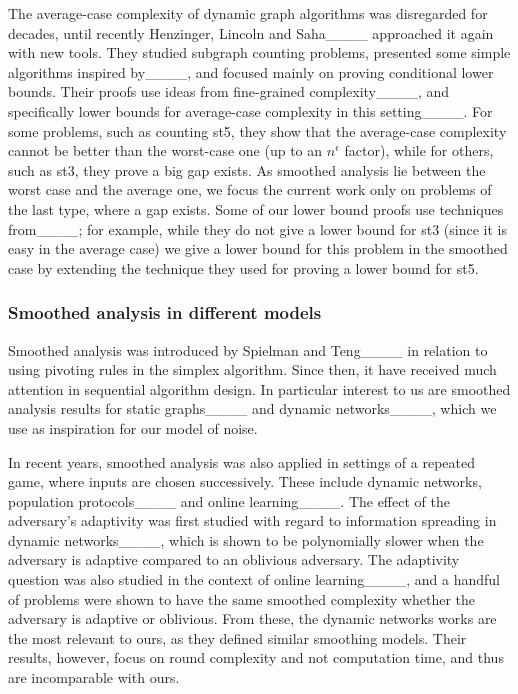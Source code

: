  
The average-case complexity of dynamic graph algorithms was disregarded for decades, until recently Henzinger, Lincoln and Saha____
approached it again with new tools.
They studied subgraph counting problems, 
presented some simple algorithms inspired by____,
and focused mainly on proving conditional lower bounds.
Their proofs use ideas from fine-grained complexity____, and specifically lower bounds for average-case complexity in this setting____.
For some problems, such as counting \paths st5, they show that the average-case complexity cannot be better than the worst-case one (up to an $n^\epsilon$ factor), while for others, such as 
\paths st3, they prove a big gap exists.
As smoothed analysis lie between the worst case and the average one, we focus the current work only on problems of the last type, where a gap exists.
Some of our lower bound proofs use techniques from____;
for example, while they do not give a lower bound for \paths st3 (since it is easy in the average case) we give a lower bound for this problem in the smoothed case
by extending the technique they used for proving a lower bound for \paths st5.

\subsubsection{Smoothed analysis in different models}
Smoothed analysis was introduced by Spielman and Teng____ in relation to using pivoting rules in the simplex algorithm. 
Since then, it have received much attention in sequential algorithm design.
In particular interest to us are smoothed analysis results for static graphs____ 
and dynamic networks____,
which we use as inspiration for our model of noise.

In recent years, smoothed analysis was also applied in settings of a repeated game, where inputs are chosen successively.
These include dynamic networks, population protocols____ and online learning____.
The effect of the adversary's adaptivity was first studied with regard to information spreading in dynamic networks____,
which is shown to be polynomially slower when the adversary is adaptive compared to an oblivious adversary.
The adaptivity question was also studied in the context of online learning____, and a handful of problems were shown to have the same smoothed complexity whether the adversary is adaptive or oblivious.
From these, the dynamic networks works are the most relevant to ours, as they defined similar smoothing models. 
Their results, however, focus on round complexity and not computation time, and thus are incomparable with ours.